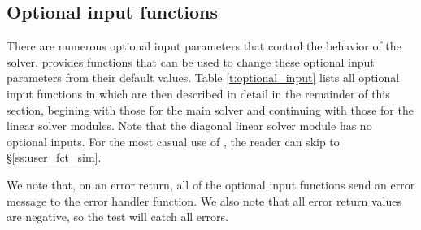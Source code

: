 \subsection{Optional input functions}\label{ss:optional_input}

There are numerous optional input parameters that control the behavior
of the {\cvode} solver.  {\cvode} provides functions that can be used to change
these optional input parameters from their default values. 
Table \ref{t:optional_input} lists all optional input functions in {\cvode} which 
are then described in detail in the remainder of this section, begining with those
for the main {\cvode} solver and continuing with those for the linear solver
modules. Note that the diagonal linear solver module has no optional inputs.
For the most casual use of {\cvode}, the reader can skip to \S\ref{ss:user_fct_sim}.

We note that, on an error return, all of the optional input functions send an
error message to the error handler function. 
We also note that all error return values are negative, so the test 
will catch all errors.

